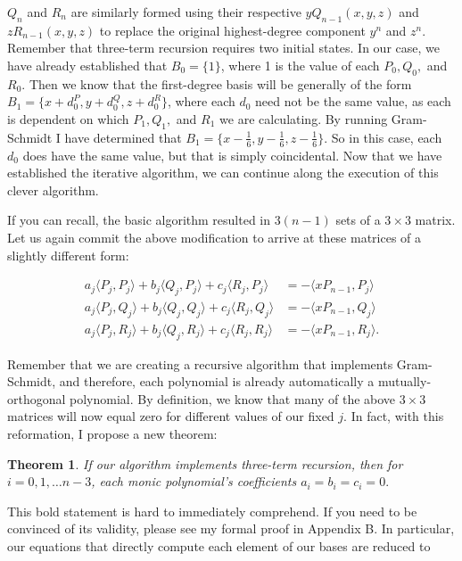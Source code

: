 \documentclass[letterpaper, 12pt]{article}
\newtheorem{thm}{Theorem}[section]
\begin{document}
\noindent $Q_n$ and $R_n$ are similarly formed using their respective $yQ_{n-1}(x, y, z)$ and $zR_{n-1}(x, y, z)$ to replace the original highest-degree component $y^n$ and $z^n$. Remember that three-term recursion requires two initial states. In our case, we have already established that $B_0 = \{1\}$, where 1 is the value of each $P_0, Q_0,$ and $R_0$. Then we know that the first-degree basis will be generally of the form $B_1 = \{x + d_0^P, y + d_0^Q, z + d_0^R\}$, where each $d_0$ need not be the same value, as each is dependent on which $P_1, Q_1,$ and $R_1$ we are calculating. By running Gram-Schmidt I have determined that $B_1 = \{x -\frac{1}{6}, y -\frac{1}{6}, z -\frac{1}{6}\}$. So in this case, each $d_0$ does have the same value, but that is simply coincidental. Now that we have established the iterative algorithm, we can continue along the execution of this clever algorithm.

If you can recall, the basic algorithm resulted in $3(n-1)$ sets of a $3\times 3$ matrix. Let us again commit the above modification to arrive at these matrices of a slightly different form:

\newpage
\vspace*{-22mm}
\begin{align*}
	a_j\langle P_j, P_j \rangle + b_j\langle Q_j, P_j \rangle + c_j\langle R_j, P_j \rangle &= - \langle xP_{n-1}, P_j\rangle \\
	a_j\langle P_j, Q_j \rangle + b_j\langle Q_j, Q_j \rangle + c_j\langle R_j, Q_j \rangle &= - \langle xP_{n-1}, Q_j\rangle \\
	a_j\langle P_j, R_j \rangle + b_j\langle Q_j, R_j \rangle + c_j\langle R_j, R_j \rangle&= - \langle xP_{n-1}, R_j\rangle.
\end{align*}

\noindent Remember that we are creating a recursive algorithm that implements Gram-Schmidt, and therefore, each polynomial is already automatically a mutually-orthogonal polynomial. By definition, we know that many of the above $3\times 3$ matrices will now equal zero for different values of our fixed $j$. In fact, with this reformation, I propose a new theorem:

\vspace*{2mm}
\begin{thm}
If our algorithm implements three-term recursion, then for $i = 0, 1, \ldots n-3$, each monic polynomial's coefficients $a_i=b_i=c_i=0.$
\end{thm}

\vspace*{2mm}
\noindent This bold statement is hard to immediately comprehend. If you need to be convinced of its validity, please see my formal proof in Appendix B. In particular, our equations that directly compute each element of our bases are reduced to
\end{document}
